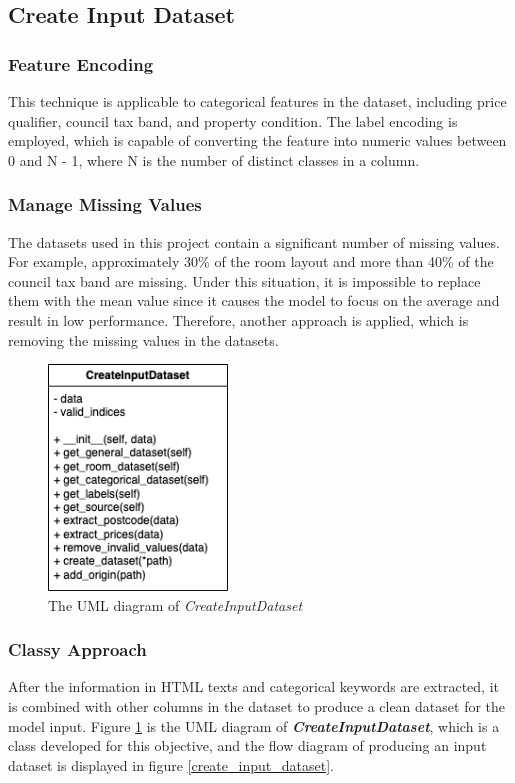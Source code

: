 \documentclass[12pt,twoside]{report}
\begin{document}
\subsection{Create Input Dataset}
\label{create_input_dataset_section}
\subsubsection{Feature Encoding}
This technique is applicable to categorical features in the dataset, including price qualifier, council tax band, and property condition. The label encoding is employed, which is capable of converting the feature into numeric values between 0 and N - 1, where N is the number of distinct classes in a column.

\subsubsection{Manage Missing Values}
The datasets used in this project contain a significant number of missing values. For example, approximately 30\% of the room layout and more than 40\% of the council tax band are missing. Under this situation, it is impossible to replace them with the mean value since it causes the model to focus on the average and result in low performance. Therefore, another approach is applied, which is removing the missing values in the datasets. 

\begin{figure}[!htbp]
	\centering
	\includegraphics[height=6cm]{uml_create_input_dataset}
	\caption{The UML diagram of \textit{CreateInputDataset}}
	\label{uml_create_input_dataset}
\end{figure}

\subsubsection{Classy Approach}
After the information in HTML texts and categorical keywords are extracted, it is combined with other columns in the dataset to produce a clean dataset for the model input.  Figure \ref{uml_create_input_dataset} is the UML diagram of \textit{\textbf{CreateInputDataset}}, which is a class developed for this objective, and the flow diagram of producing an input dataset is displayed in figure \ref{create_input_dataset}.
\end{document}
